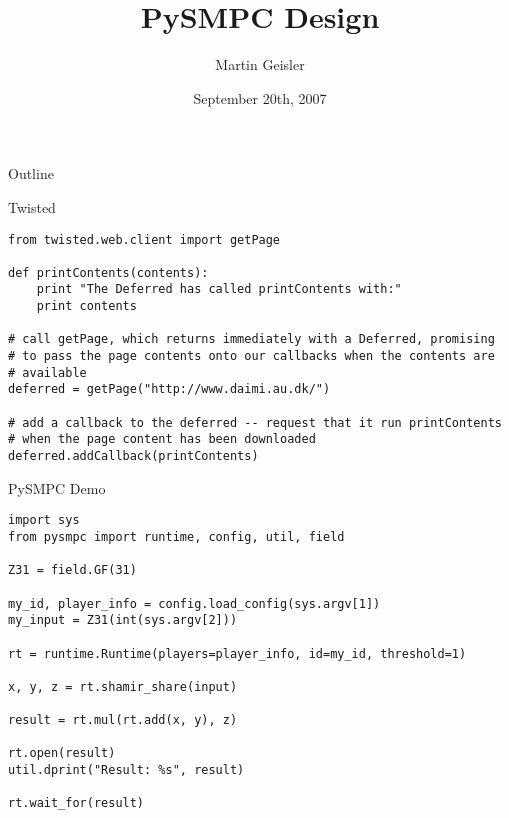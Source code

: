 \documentclass[t]{beamer}
\title{PySMPC Design}
\author{Martin Geisler}
\institute[BRICS]{
  BRICS\\
  Department of Computer Science\\
  University of Aarhus
}
\date{September 20th, 2007}
\begin{document}
\begin{frame}
  \titlepage
\end{frame}

\begin{frame}{Outline}
  \tableofcontents
\end{frame}


\begin{frame}[fragile]{Twisted}%

\begin{lstlisting}
from twisted.web.client import getPage

def printContents(contents):
    print "The Deferred has called printContents with:"
    print contents

# call getPage, which returns immediately with a Deferred, promising
# to pass the page contents onto our callbacks when the contents are
# available
deferred = getPage("http://www.daimi.au.dk/")

# add a callback to the deferred -- request that it run printContents
# when the page content has been downloaded
deferred.addCallback(printContents)
\end{lstlisting}

\end{frame}

\begin{frame}[fragile]{PySMPC Demo}

\begin{lstlisting}
import sys
from pysmpc import runtime, config, util, field

Z31 = field.GF(31)

my_id, player_info = config.load_config(sys.argv[1])
my_input = Z31(int(sys.argv[2]))

rt = runtime.Runtime(players=player_info, id=my_id, threshold=1)

x, y, z = rt.shamir_share(input)

result = rt.mul(rt.add(x, y), z)

rt.open(result)
util.dprint("Result: %s", result)

rt.wait_for(result)
\end{lstlisting}

\end{frame}
\end{document}
